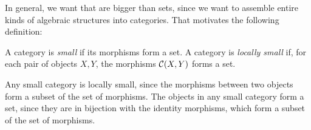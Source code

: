 

In general, we want  that are bigger than sets, since
we want to assemble entire kinds of algebraic structures into categories. That
motivates the following definition:

\begin{dfn*}
	A category is \emph{small} if its morphisms form a set. A category is
	\emph{locally small} if, for each pair of objects $X, Y$, the morphisms
	$\mathcal{C}(X, Y)$ forms a set.
\end{dfn*}

Any small category is locally small, since the morphisms between two objects
form a subset of the set of morphisms. The objects in any small category form a
set, since they are in bijection with the identity morphisms, which form a
subset of the set of morphisms.


